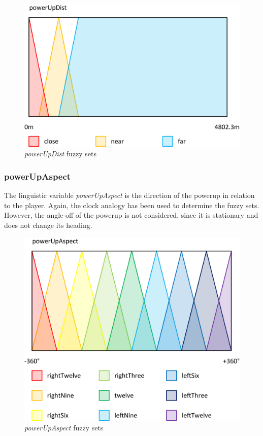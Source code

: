 \begin{figure}[H]
\centering
\caption{\emph{powerUpDist} fuzzy sets}
\includegraphics[scale=0.08]{./img/pdf/powerUpDistSets.pdf}
\end{figure}

\subsubsection{powerUpAspect}

The linguistic variable \emph{powerUpAspect} is the direction of the powerup in relation to the player. Again, the clock analogy has been used to determine the fuzzy sets. However, the angle-off of the powerup is not considered, since it is stationary and does not change its heading.

\begin{figure}[H]
\centering
\caption{\emph{powerUpAspect} fuzzy sets}
\includegraphics[scale=0.08]{./img/pdf/powerUpAspectSets.pdf}
\end{figure}

